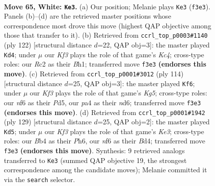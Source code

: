 \documentclass[11pt]{article}
\begin{document}
\clearpage

\begin{figure}[p]\centering
\begin{subfigure}{0.46\textwidth}\centering
\resizebox{\linewidth}{!}{%
\newchessgame
\chessboard[
  setfen={7k/5p2/5n2/3r4/pB3P1p/P4K1P/2R5/8 w - - 5 65},
  showmover=false,
  pgfstyle=straightmove, color=movearrow, markmove={f3-e3}
]}
\caption{}
\end{subfigure}\hfill
\begin{subfigure}{0.46\textwidth}\centering
\resizebox{\linewidth}{!}{%
\newchessgame
\chessboard[
  setfen={8/2k5/7p/p1P2p2/P1K2n1P/8/8/7B w - - 0 62},
  showmover=false,
  pgfstyle=straightmove, color=movearrow, markmove={c4-d4}
]}
\caption{}
\end{subfigure}
\\[4pt]
\begin{subfigure}{0.46\textwidth}\centering
\resizebox{\linewidth}{!}{%
\newchessgame
\chessboard[
  setfen={r7/5p1P/3n4/3P2K1/3P2B1/2k2P2/8/8 w - - 3 58},
  showmover=false,
  pgfstyle=straightmove, color=movearrow, markmove={g5-f6}
]}
\caption{}
\end{subfigure}\hfill
\begin{subfigure}{0.46\textwidth}\centering
\resizebox{\linewidth}{!}{%
\newchessgame
\chessboard[
  setfen={8/6p1/4k2p/1P5P/3b1P2/p5P1/4K3/1B6 b - - 0 65},
  showmover=false,
  pgfstyle=straightmove, color=movearrow, markmove={e6-d5}
]}
\caption{}
\end{subfigure}
\caption{\textbf{Move 65, White: \texttt{Ke3}.} (a) Our position; Melanie plays \texttt{Ke3} (\texttt{f3e3}). Panels (b)--(d) are the retrieved master positions whose correspondence most drove this move (highest QAP objective among those that transfer to it). (b) Retrieved from \texttt{ccrl\_top\_p0003\#1140} (ply 122) [structural distance $d$=22, QAP obj=3]: the master played \texttt{Kd4}; under $\mu$ our \emph{Kf3} plays the role of that game's \emph{Kc4}; cross-type roles: our \emph{R}c2 as their \emph{B}h1; transferred move \texttt{f3e3} \textbf{(endorses this move)}. (c) Retrieved from \texttt{ccrl\_top\_p0001\#3012} (ply 114) [structural distance $d$=25, QAP obj=3]: the master played \texttt{Kf6}; under $\mu$ our \emph{Kf3} plays the role of that game's \emph{Kg5}; cross-type roles: our \emph{n}f6 as their \emph{P}d5, our \emph{p}a4 as their \emph{n}d6; transferred move \texttt{f3e3} \textbf{(endorses this move)}. (d) Retrieved from \texttt{ccrl\_top\_p0001\#1942} (ply 129) [structural distance $d$=25, QAP obj=2]: the master played \texttt{Kd5}; under $\mu$ our \emph{Kf3} plays the role of that game's \emph{Ke3}; cross-type roles: our \emph{B}b4 as their \emph{P}h6, our \emph{n}f6 as their \emph{B}d4; transferred move \texttt{f3e3} \textbf{(endorses this move)}. Synthesis: 9 retrieved analogs transferred to \texttt{Ke3} (summed QAP objective 19, the strongest correspondence among the candidate moves); Melanie committed it via the \texttt{search} selector.}
\label{fig:thought-m128}
\end{figure}
\end{document}
